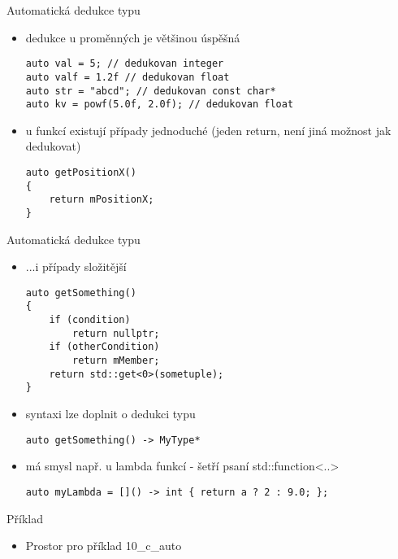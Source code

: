 \documentclass{beamer}
\begin{document}
\begin{xframe}{Automatická dedukce typu}
	\begin{itemize}
		\item dedukce u proměnných je většinou úspěšná
\begin{lstlisting}[basicstyle=\fontsize{8}{9}\selectfont\ttfamily]
auto val = 5; // dedukovan integer
auto valf = 1.2f // dedukovan float
auto str = "abcd"; // dedukovan const char*
auto kv = powf(5.0f, 2.0f); // dedukovan float
\end{lstlisting}
		\item u funkcí existují případy jednoduché (jeden return, není jiná možnost jak dedukovat)
\begin{lstlisting}[basicstyle=\fontsize{8}{9}\selectfont\ttfamily]
auto getPositionX()
{
    return mPositionX;
}
\end{lstlisting}
	\end{itemize}
\end{xframe}

\begin{xframe}{Automatická dedukce typu}
	\begin{itemize}
		\item ...i případy složitější
\begin{lstlisting}[basicstyle=\fontsize{8}{9}\selectfont\ttfamily]
auto getSomething()
{
    if (condition)
        return nullptr;
    if (otherCondition)
        return mMember;
    return std::get<0>(sometuple);
}
\end{lstlisting}
		\item syntaxi lze doplnit o dedukci typu
\begin{lstlisting}[basicstyle=\fontsize{8}{9}\selectfont\ttfamily]
auto getSomething() -> MyType*
\end{lstlisting}
		\item má smysl např. u lambda funkcí - šetří psaní std::function<..>
\begin{lstlisting}[basicstyle=\fontsize{8}{9}\selectfont\ttfamily]
auto myLambda = []() -> int { return a ? 2 : 9.0; };
\end{lstlisting}
	\end{itemize}
\end{xframe}

\begin{xframe}{Příklad}
	\begin{itemize}
		\item Prostor pro příklad 10\_c\_auto
	\end{itemize}
\end{xframe}
\end{document}
